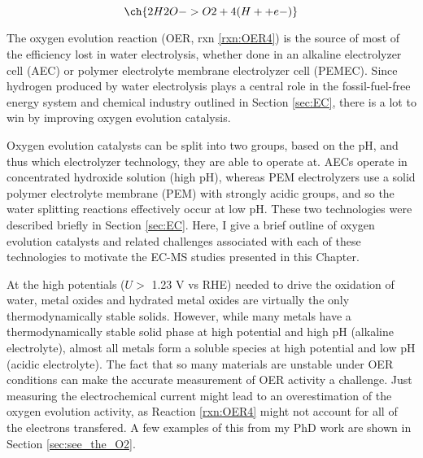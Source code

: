 
\begin{equation}
\ch{2 H2O -> O2 + 4 (H+ + e-)}\label{rxn:OER4}
\end{equation}

The oxygen evolution reaction (OER, rxn \ref{rxn:OER4}) is the source of most of the efficiency lost in water electrolysis\cite{Seh2017, Kibsgaard2019}, whether done in an alkaline electrolyzer cell (AEC)\cite{LeRoy1979, Dionigi2016b} or polymer electrolyte membrane electrolyzer cell (PEMEC)\cite{Carmo2013, Reier2017}. Since hydrogen produced by water electrolysis plays a central role in the fossil-fuel-free energy system and chemical industry outlined in Section \ref{sec:EC}, there is a lot to win by improving oxygen evolution catalysis.

Oxygen evolution catalysts can be split into two groups, based on the pH, and thus which electrolyzer technology, they are able to operate at. AECs operate in concentrated hydroxide solution (high pH), whereas PEM electrolyzers use a solid polymer electrolyte membrane (PEM) with strongly acidic groups, and so the water splitting reactions effectively occur at low pH\cite{Carmo2013, Xiang2016}. These two technologies were described briefly in Section \ref{sec:EC}. Here, I give a brief outline of oxygen evolution catalysts and related challenges associated with each of these technologies to motivate the EC-MS studies presented in this Chapter.

At the high potentials ($U>$ 1.23 V vs RHE) needed to drive the oxidation of water, metal oxides and hydrated metal oxides are virtually the only thermodynamically stable solids\cite{Pourbaix1966}. However, while many metals have a thermodynamically stable solid phase at high potential and high pH (alkaline electrolyte), almost all metals form a soluble species at high potential and low pH (acidic electrolyte). The fact that so many materials are unstable under OER conditions can make the accurate measurement of OER activity a challenge. Just measuring the electrochemical current might lead to an overestimation of the oxygen evolution activity, as Reaction \ref{rxn:OER4} might not account for all of the electrons transfered. A few examples of this from my PhD work are shown in Section \ref{sec:see_the_O2}.

